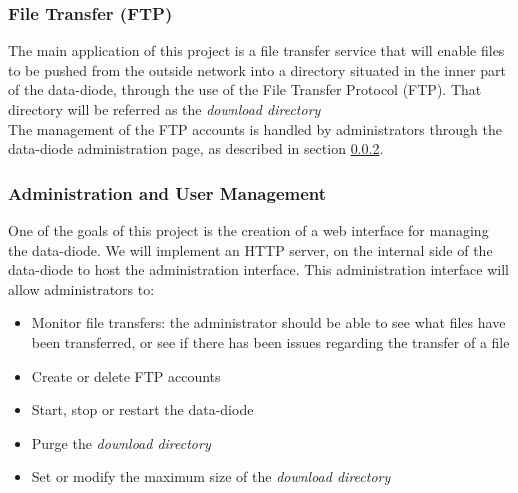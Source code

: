 \documentclass[a4paper,11pt]{article}
\begin{document}
\subsubsection{File Transfer (FTP)}
The main application of this project is a file transfer service that will enable files to be pushed from the outside network into a directory situated in the inner part of the data-diode, through the use of the File Transfer Protocol (FTP). That directory will be referred as the \textit{download directory}\\

The management of the FTP accounts is handled by administrators through the data-diode administration page, as described in section \ref{sec:administration}.

\subsubsection{Administration and User Management}
\label{sec:administration}
One of the goals of this project is the creation of a web interface for managing the data-diode. We will implement an HTTP server, on the internal side of the data-diode to host the administration interface. This administration interface will allow administrators to:

\begin{itemize}
\item{Monitor file transfers: the administrator should be able to see what files have been transferred, or see if there has been issues regarding the transfer of a file}
\item{Create or delete FTP accounts}
\item{Start, stop or restart the data-diode}
\item{Purge the \textit{download directory}}
\item{Set or modify the maximum size of the \textit{download directory}}
\end{itemize}
\end{document}
